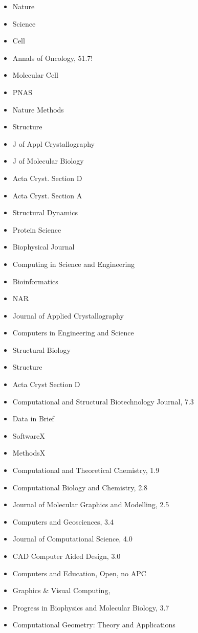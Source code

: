 \documentclass[10pt,letterpaper]{article}
\begin{document}
\begin{itemize}
\item Nature
\item Science
\item Cell
\item Annals of Oncology, 51.7!
\item Molecular Cell
\item PNAS
\item Nature Methods
\item Structure
\item J of Appl Crystallography
\item J of Molecular Biology
\item Acta Cryst. Section D
\item Acta Cryst. Section A
\item Structural Dynamics
\item Protein Science
\item Biophysical Journal
\item Computing in Science and Engineering
\item Bioinformatics
\item NAR
\item Journal of Applied Crystallography
\item Computers in Engineering and Science
\item Structural Biology
\item Structure
\item Acta Cryst Section D
\item Computational and Structural Biotechnology Journal, 7.3
\item Data in Brief
\item SoftwareX    
\item MethodsX
\item Computational and Theoretical Chemistry, 1.9
\item Computational Biology and Chemistry, 2.8    
\item Journal of Molecular Graphics and Modelling, 2.5
\item Computers and Geosciences, 3.4
\item Journal of Computational Science, 4.0
\item CAD Computer Aided Design, 3.0    
\item Computers and Education, Open, no APC
\item Graphics \& Visual Computing,
\item Progress in Biophysics and Molecular Biology, 3.7    
\item Computational Geometry: Theory and Applications

\end{itemize}
\end{document}
